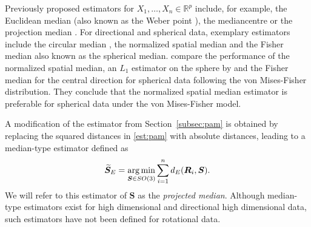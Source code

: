 Previously proposed estimators for $X_1, \ldots,X_n \in \mathbb{R}^p$  include, for example, the Euclidean median (also known as the Weber point \citep{bajaj88}), the mediancentre \citep{gower74} or the projection median \citep{durocher09}. %
For directional and spherical data, exemplary estimators include the circular median \citep{mardia72}, the normalized spatial median \citep{ducharme87} and the Fisher median \citep{fisher85} also known as the spherical median. \citet{chan93} compare the performance of the normalized spatial median,  an $L_1$ estimator on the sphere by \cite{he92} and the Fisher median for the central direction for spherical data following the von Mises-Fisher distribution. They conclude that the normalized spatial median estimator is preferable for spherical data under the von Mises-Fisher model. 

A modification of the estimator from Section~\ref{subsec:pam}  is obtained by replacing the squared distances in \eqref{est:pam} with absolute distances, leading to a median-type estimator defined as
\begin{equation}\label{est:med}
{\widetilde{\bm S}_E}=\operatorname*{arg\,min}_{\bm{S}\in
SO(3)}\sum_{i=1}^n{d_E}(\bm{R}_i,\bm{S}).
\end{equation}
We will refer to this estimator of $\bm{S}$ as the \textit{projected median}.  %
Although median-type estimators exist for high dimensional and directional  high dimensional  data, such estimators have not been defined for rotational data. 

